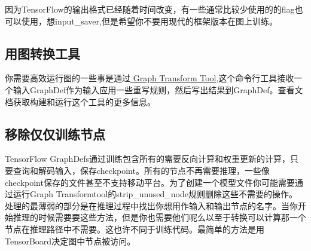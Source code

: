 因为TensorFlow的输出格式已经随着时间改变，有一些通常比较少使用的的flag也可以使用，想input\_saver,但是希望你不要用现代的框架版本在图上训练。
\subsection{用图转换工具}
你需要高效运行图的一些事是通过\href{https://www.github.com/tensorflow/tensorflow/blob/r1.4/tensorflow/tools/graph_transforms/README.md}{ Graph Transform Tool},这个命令行工具接收一个输入GraphDef作为输入应用一些重写规则，然后写出结果到GraphDef。查看文档获取构建和运行这个工具的更多信息。
\subsection{移除仅仅训练节点}
TensorFlow GraphDefs通过训练包含所有的需要反向计算和权重更新的计算，只要查询和解码输入，保存checkpoint。所有的节点不再需要推理，一些像checkpoint保存的文件甚至不支持移动平台。为了创建一个模型文件你可能需要通过运行Graph Transformtool的strip\_unused\_node规则删除这些不需要的操作。
处理的最薄弱的部分是在推理过程中找出你想用作输入和输出节点的名字。当你开始推理的时候需要要这些方法，但是你也需要他们呢么以至于转换可以计算那一个节点在推理路径中不需要。这也许不同于训练代码。最简单的方法是用TensorBoard决定图中节点被访问。

